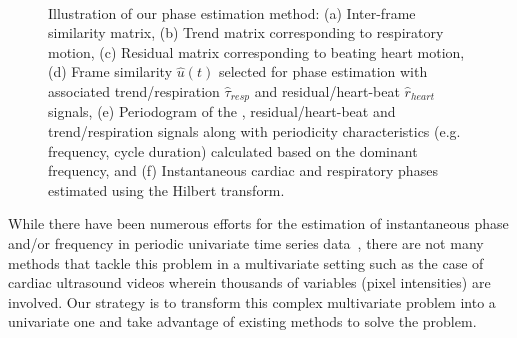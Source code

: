 \documentclass[journal]{IEEEtran}
\newcommand{\rk}[1]{{\color{blue}{#1}}}
\newcounter{lfigcounter}
\def\ionbox#1{\makebox[#1]{(\alph{lfigcounter})}\stepcounter{lfigcounter}}
\begin{document}
\begin{figure}[!t]
\ionbox{6.0in}\\
%
\caption{Illustration of our phase estimation method: (a) Inter-frame similarity matrix, (b) Trend matrix corresponding to respiratory motion, (c) Residual matrix corresponding to beating heart motion, (d) Frame similarity $\hat{u}(t)$ selected for phase estimation with associated trend/respiration $\hat{\tau}_{resp}$ and residual/heart-beat $\hat{r}_{heart}$ signals, (e) Periodogram of the \rk{frame similarity}, residual/heart-beat and trend/respiration signals along with periodicity characteristics (e.g. frequency, cycle duration) calculated based on the dominant frequency, and (f) Instantaneous cardiac and respiratory phases estimated using the Hilbert transform.}
\label{fig:phase_estimation}
\end{figure}
%

While there have been numerous efforts for the estimation of instantaneous phase and/or frequency in periodic univariate time series data~\cite{Boashash1992,Rosenblum2001,Freund2003,Luo2003,Lu2013}, there are not many methods that tackle this problem in a multivariate setting such as the case of cardiac ultrasound videos wherein thousands of variables (pixel intensities) are involved. Our strategy is to transform this complex multivariate problem into a univariate one and take advantage of existing methods to solve the problem. 
%
\end{document}
